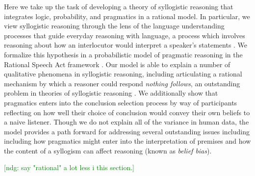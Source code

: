 \documentclass[floatsintext, doc]{apa6}
\newcommand{\mht}[1]{{\textcolor{Blue}{[mht: #1]}}}
\newcommand{\ndg}[1]{{\textcolor{Green}{[ndg: #1]}}}
\begin{document}
Here we take up the task of developing a theory of syllogistic reasoning that integrates logic, probability, and pragmatics in a rational model.
In particular, we view syllogistic reasoning through the lens of the language understanding processes that guide everyday reasoning with language, a process which involves reasoning about how an interlocutor would interpret a speaker's statements \cite{Grice1975, Clark1996, Levinson2000}. 
We formalize this hypothesis in a probabilistic model of pragmatic reasoning in the Rational Speech Act framework \cite{Frank2012a, goodman2016pragmatic}.
Our model is able to explain a number of qualitative phenomena in syllogistic reasoning, including articulating a rational mechanism by which a reasoner could respond \emph{nothing follows}, an outstanding problem in theories of syllogistic reasoning \cite{riesterer2020modeling}.
We additionally show that pragmatics enters into the conclusion selection process by way of participants reflecting on how well their choice of conclusion would convey their own beliefs to a naive listener. 
Though we do not explain all of the variance in human data, the model provides a path forward for addressing several outstanding issues including including how pragmatics might enter into the interpretation of premises and  how the content of a syllogism can affect reasoning (known as \emph{belief bias}).

\ndg{say "rational" a lot less i this section.}


\end{document}
